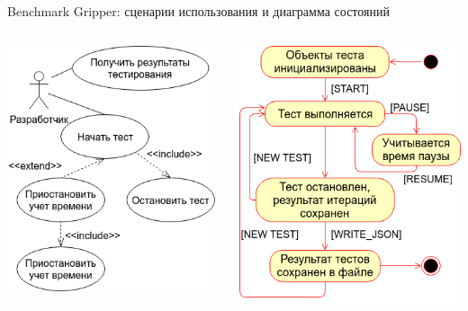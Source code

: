 \begin{frame}{Benchmark Gripper: сценарии использования и диаграмма состояний}
	\begin{columns}[onlytextwidth]
		\begin{column}{0.49\textwidth}
			\includegraphics[width=\textwidth]{img/uc.png}
		\end{column}
		\begin{column}{0.49\textwidth}
			\includegraphics[width=\textwidth]{img/sm.png}

\end{column}
\end{columns}
\end{frame}

